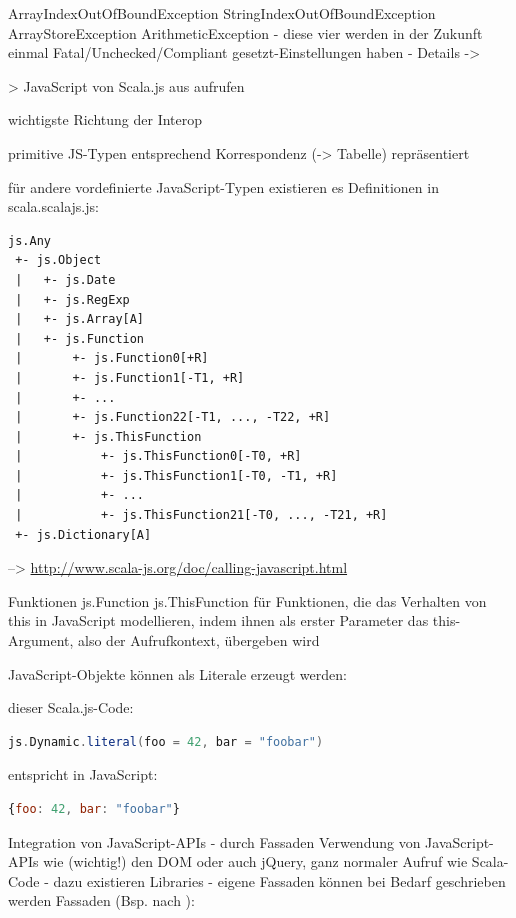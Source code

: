 \documentclass[a4paper, 12pt, listof=totoc, bibliography=totoc]{scrreprt}
\begin{document}
		ArrayIndexOutOfBoundException
		StringIndexOutOfBoundException
		ArrayStoreException
		ArithmeticException
		- diese vier werden in der Zukunft einmal Fatal/Unchecked/Compliant gesetzt-Einstellungen haben
	- Details -> 




> JavaScript von Scala.js aus aufrufen

wichtigste Richtung der Interop

primitive JS-Typen entsprechend Korrespondenz (-> Tabelle) repräsentiert

für andere vordefinierte JavaScript-Typen existieren es Definitionen in scala.scalajs.js:

\begin{lstlisting}
js.Any
 +- js.Object
 |   +- js.Date
 |   +- js.RegExp
 |   +- js.Array[A]
 |   +- js.Function
 |       +- js.Function0[+R]
 |       +- js.Function1[-T1, +R]
 |       +- ...
 |       +- js.Function22[-T1, ..., -T22, +R]
 |       +- js.ThisFunction
 |           +- js.ThisFunction0[-T0, +R]
 |           +- js.ThisFunction1[-T0, -T1, +R]
 |           +- ...
 |           +- js.ThisFunction21[-T0, ..., -T21, +R]
 +- js.Dictionary[A]
\end{lstlisting}
-->  \url{http://www.scala-js.org/doc/calling-javascript.html}


Funktionen
	js.Function
	js.ThisFunction für Funktionen, die das Verhalten von this in JavaScript modellieren, indem ihnen als erster Parameter das this-Argument, also der Aufrufkontext, übergeben wird

JavaScript-Objekte können als Literale erzeugt werden:

dieser Scala.js-Code:
\begin{lstlisting}[language=Scala]
js.Dynamic.literal(foo = 42, bar = "foobar")
\end{lstlisting}

entspricht in JavaScript:
\begin{lstlisting}[language=JavaScript]
{foo: 42, bar: "foobar"}
\end{lstlisting}


Integration von JavaScript-APIs
- durch Fassaden Verwendung von JavaScript-APIs wie (wichtig!) den DOM oder auch jQuery, ganz normaler Aufruf wie Scala-Code
	- dazu existieren Libraries
	- eigene Fassaden können bei Bedarf geschrieben werden
		Fassaden (Bsp. nach \cite{doeraene2015.SSP}):
\end{document}
